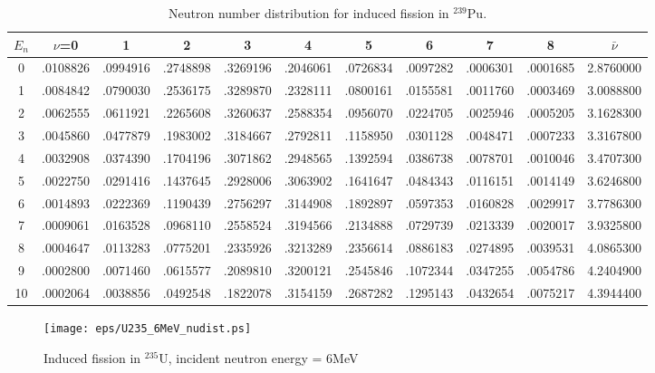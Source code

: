 \documentclass[11pt]{article}
\begin{document}
\begin{table}[ht]
\footnotesize
\begin{center}
\begin{tabular}{|c|ccccccccc|c|} \hline
$E_n$ & $\nu$=0 & 1 & 2 & 3 & 4 & 5 & 6 & 7 & 8 & $\bar{\nu}$ \\ \hline
0 & .0108826 & .0994916 & .2748898 & .3269196 & .2046061 & .0726834 & .0097282 & .0006301 & .0001685 & 2.8760000 \\
1 & .0084842 & .0790030 & .2536175 & .3289870 & .2328111 & .0800161 & .0155581 & .0011760 & .0003469 & 3.0088800 \\
2 & .0062555 & .0611921 & .2265608 & .3260637 & .2588354 & .0956070 & .0224705 & .0025946 & .0005205 & 3.1628300 \\
3 & .0045860 & .0477879 & .1983002 & .3184667 & .2792811 & .1158950 & .0301128 & .0048471 & .0007233 & 3.3167800 \\
4 & .0032908 & .0374390 & .1704196 & .3071862 & .2948565 & .1392594 & .0386738 & .0078701 & .0010046 & 3.4707300 \\
5 & .0022750 & .0291416 & .1437645 & .2928006 & .3063902 & .1641647 & .0484343 & .0116151 & .0014149 & 3.6246800 \\
6 & .0014893 & .0222369 & .1190439 & .2756297 & .3144908 & .1892897 & .0597353 & .0160828 & .0029917 & 3.7786300 \\
7 & .0009061 & .0163528 & .0968110 & .2558524 & .3194566 & .2134888 & .0729739 & .0213339 & .0020017 & 3.9325800 \\
8 & .0004647 & .0113283 & .0775201 & .2335926 & .3213289 & .2356614 & .0886183 & .0274895 & .0039531 & 4.0865300 \\
9 & .0002800 & .0071460 & .0615577 & .2089810 & .3200121 & .2545846 & .1072344 & .0347255 & .0054786 & 4.2404900 \\
10& .0002064 & .0038856 & .0492548 & .1822078 & .3154159 & .2687282 & .1295143 & .0432654 & .0075217 & 4.3944400 \\ \hline
\end{tabular}
\end{center}
\caption{Neutron number distribution for induced fission in $^{239}$Pu.}
\label{Neutron number distribution for induced fission in 239Pu}
\end{table}

\begin{figure}[ht]
\begin{center}
\texttt{[image: eps/U235\_6MeV\_nudist.ps]}
\end{center}
\caption{Induced fission in $^{235}$U, incident neutron energy = 6MeV}
\label{235U induced fission 6MeV}
\end{figure}
\end{document}
